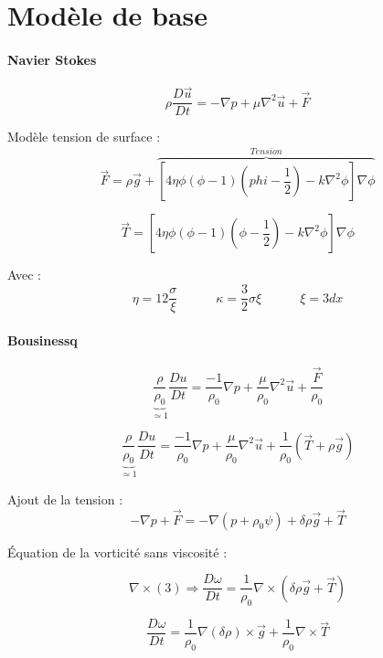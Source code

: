 \documentclass[10pt,a4paper]{article}
\author{Malo Kerebel}
\begin{document}
\section{Modèle de base}


\paragraph{Navier Stokes }

\begin{equation}
	\rho \dfrac{D \vec{u}}{D t} = - \nabla p + \mu \nabla^2 \vec{u} + \vec{F}
\end{equation}

Modèle tension de surface :
\begin{equation}
	\vec{F} = \rho \vec{g} + \overbrace{\left[ 4 \eta \phi (\phi - 1) \left(phi - \dfrac{1}{2} \right) - k\nabla^2 \phi \right] \nabla \phi}^{Tension}
\end{equation}

\[ \vec{T} = \left[ 4 \eta \phi (\phi - 1) \left(\phi - \dfrac{1}{2} \right) - k\nabla^2 \phi \right] \nabla \phi\]

Avec :
\[\eta = 12 \dfrac{\sigma}{\xi} \quad \quad \quad \kappa = \dfrac{3}{2} \sigma \xi \quad \quad \quad \xi = 3 dx
\]

\paragraph{Bousinessq}

\begin{equation}
	\underbrace{\dfrac{\rho}{\rho_0}}_{\simeq 1} \dfrac{D u}{D t} = \dfrac{-1}{\rho_0} \nabla p + \dfrac{\mu }{\rho_0} \nabla^2 \vec{u} + \dfrac{\vec{F}}{\rho_0}
\end{equation}

\[
	\underbrace{\dfrac{\rho}{\rho_0}}_{\simeq 1} \dfrac{D u}{D t} = \dfrac{-1}{\rho_0} \nabla p + \dfrac{\mu }{\rho_0} \nabla^2 \vec{u} + \dfrac{1}{\rho_0}\left(\vec{T}+\rho \vec{g}\right)
\]

Ajout de la tension :
\[
	-\nabla p + \vec{F} = - \nabla (p + \rho_0 \psi) + \delta \rho \vec{g} + \vec{T}
\]

Équation de la vorticité sans viscosité :

\[
	\nabla \times (3) \Rightarrow \dfrac{D\omega}{D t} =  \dfrac{1}{\rho_0} \nabla \times \left( \delta \rho \vec{g} + \vec{T} \right)
\]

\[
	\dfrac{D\omega}{D t} = \dfrac{1}{\rho_0} \nabla (\delta \rho) \times \vec{g} + \dfrac{1}{\rho_0} \nabla \times \vec{T}
\]
\end{document}
